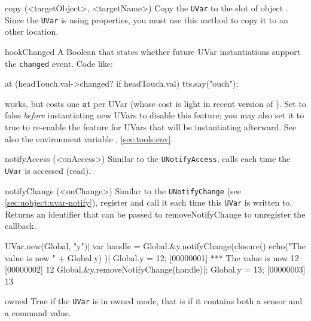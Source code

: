 \begin{urbiscriptapi}

\item[copy](<targetObject>, <targetName>)
  Copy the \lstinline|UVar| to the slot  of object
  . Since the \lstinline|UVar| is using properties, you must
  use this method to copy it to an other location.

\item[hookChanged]%
  A Boolean that states whether future UVar instantiations support the
  \lstinline|changed| event.  Code like:

\begin{urbiunchecked}
at (headTouch.val->changed? if headTouch.val)
  tts.say("ouch");
\end{urbiunchecked}
  \noindent
  works, but costs one \lstinline|at| per UVar (whose cost is light in
  recent version of \usdk).  Set  to false
  \emph{before} instantiating new UVars to disable this feature; you may
  also set it to true to re-enable the feature for UVars that will be
  instantiating afterward.  See also the environment variable
  , \autoref{sec:tools:env}.

\item[notifyAccess](<onAccess>)%
  Similar to the \Cxx \lstinline|UNotifyAccess|, calls  each
  time the \lstinline|UVar| is accessed (read).

\item[notifyChange](<onChange>)
  Similar to the \Cxx \lstinline|UNotifyChange|
  (see \autoref{sec:uobject:uvar-notify}), register  and
  call it each time this \lstinline|UVar| is written to.
  Returns an identifier that can be passed to removeNotifyChange to
  unregister the callback.

\begin{urbiscript}
UVar.new(Global, "y")|
var handle = Global.&y.notifyChange(closure() {
  echo("The value is now " + Global.y)
})|
Global.y = 12;
[00000001] *** The value is now 12
[00000002] 12
Global.&y.removeNotifyChange(handle)|;
Global.y = 13;
[00000003] 13
\end{urbiscript}

\item[owned]
  True if the \lstinline|UVar| is in owned mode, that is if it contains both a
  sensor and a command value.

\end{urbiscriptapi}

